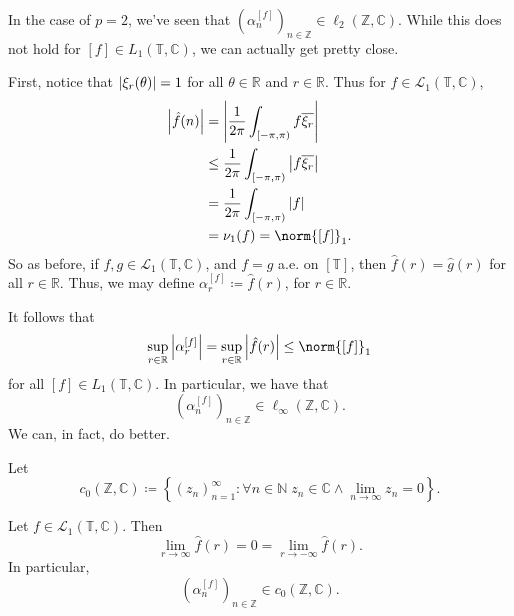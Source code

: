\documentclass[notoc,notitlepage]{tufte-book}
\begin{document}
\begin{remark}
  In the case of $p = 2$, we've seen that
  $\left( \alpha_n^{[f]} \right)_{n \in \mathbb{Z}} \in \ell_2(\mathbb{Z}, \mathbb{C})$.
  While this does not hold for $[f] \in L_1(\mathbb{T}, \mathbb{C})$,
  we can actually get pretty close.

  First, notice that $\left|\xi_r(\theta)\right| = 1$ for all $\theta \in \mathbb{R}$
  and $r \in \mathbb{R}$. Thus for $f \in \mathcal{L}_1(\mathbb{T},
  \mathbb{C})$,
  \begin{align*}
    \abs{\hat{f}(n)}
    &= \abs{ \frac{1}{2 \pi} \int_{[-\pi, \pi)} f \overline{\xi_r} } \\
    &\leq \frac{1}{2 \pi} \int_{[-\pi, \pi)} \abs{f \overline{\xi_r}} \\
    &= \frac{1}{2 \pi} \int_{[-\pi, \pi)} \abs{f} \\
    &= \nu_1(f) = \norm{[f]}_1.
  \end{align*}
  So as before, if $f, g \in \mathcal{L}_1(\mathbb{T}, \mathbb{C})$,
  and $f = g$ a.e. on $[\mathbb{T}]$, then $\hat{f}(r) = \hat{g}(r)$
  for all $r \in \mathbb{R}$.
  Thus, we may define $\alpha_r^{[f]} \coloneqq \hat{f}(r)$,
  for $r \in \mathbb{R}$.

  It follows that
  \begin{equation*}
    \sup_{r \in \mathbb{R}} \abs{\alpha_r^{[f]}}
    = \sup_{r \in \mathbb{R}} \abs{\hat{f}(r)}
    \leq \norm{[f]}_1
  \end{equation*}
  for all $[f] \in L_1(\mathbb{T}, \mathbb{C})$.
  In particular, we have that
  \begin{equation*}
    \left( \alpha_n^{[f]} \right)_{n \in \mathbb{Z}}
      \in \ell_{\infty}(\mathbb{Z}, \mathbb{C}).
  \end{equation*}
  We can, in fact, do better.
\end{remark}

Let
\begin{equation*}
  c_0(\mathbb{Z}, \mathbb{C}) \coloneqq \left\{ (z_n)_{n=1}^{\infty} :
    \forall n \in \mathbb{N}\; z_n \in \mathbb{C} \land
    \lim_{n \to \infty} z_n = 0 \right\}.
\end{equation*}

\begin{thm}\label{thm:the_riemann_lebesgue_lemma}
  Let $f \in \mathcal{L}_1(\mathbb{T}, \mathbb{C})$. Then
  \begin{equation*}
    \lim_{r \to \infty} \hat{f}(r) = 0 = \lim_{r \to - \infty} \hat{f}(r).
  \end{equation*}
  In particular,
  \begin{equation*}
    \left( \alpha_n^{[f]} \right)_{n \in \mathbb{Z}} \in c_0(\mathbb{Z},
    \mathbb{C}).
  \end{equation*}
\end{thm}
\end{document}
